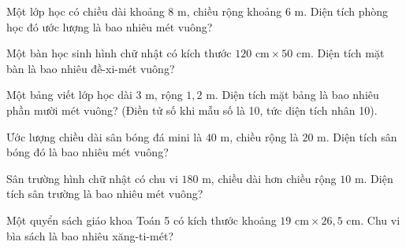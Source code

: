 
\begin{ex}
  Một lớp học có chiều dài khoảng $8\text{ m}$, chiều rộng khoảng $6\text{ m}$. Diện tích phòng học đó ước lượng là bao nhiêu mét vuông?
\end{ex}

\begin{ex}
  Một bàn học sinh hình chữ nhật có kích thước $120\text{ cm} \times 50\text{ cm}$. Diện tích mặt bàn là bao nhiêu đề-xi-mét vuông?
\end{ex}

\begin{ex}
  Một bảng viết lớp học dài $3\text{ m}$, rộng $1{,}2\text{ m}$. Diện tích mặt bảng là bao nhiêu phần mười mét vuông? (Điền tử số khi mẫu số là 10, tức diện tích nhân 10).
\end{ex}

\begin{ex}
  Ước lượng chiều dài sân bóng đá mini là $40\text{ m}$, chiều rộng là $20\text{ m}$. Diện tích sân bóng đó là bao nhiêu mét vuông?
\end{ex}

\begin{ex}
  Sân trường hình chữ nhật có chu vi $180\text{ m}$, chiều dài hơn chiều rộng $10\text{ m}$. Diện tích sân trường là bao nhiêu mét vuông?
\end{ex}

\begin{ex}
  Một quyển sách giáo khoa Toán 5 có kích thước khoảng $19\text{ cm} \times 26{,}5\text{ cm}$. Chu vi bìa sách là bao nhiêu xăng-ti-mét?
\end{ex}

